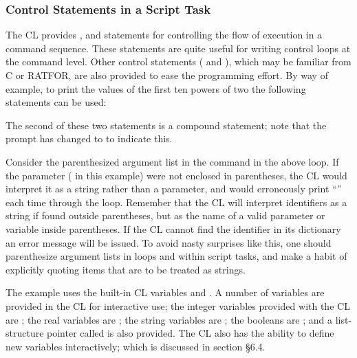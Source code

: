 \subsubsection{Control Statements in a Script Task}

The CL provides , and
 statements for controlling the flow 
of execution in a command sequence.  These statements
are quite useful for writing control loops at the command
level.  Other control statements ( and
), which may be familiar from C or RATFOR,
are also provided to ease the programming effort.
By way of example, to print the values of the first ten powers
of two the following statements can be used:

\begin{quotation}\noindent{}
\end{quotation}

\noindent
The second of these two statements is a compound statement;
note that the prompt has changed to \comptype{>>>} to indicate this.

Consider the parenthesized argument list in the 
command in the above loop.  
If the parameter ( in this example) were not enclosed in 
parentheses, the CL would interpret it as a string rather than a parameter,
and would erroneously print ``'' each time through the loop.
Remember that the CL will interpret identifiers as a string if found
outside parentheses, but as the name of a valid parameter or variable
inside parentheses.  If the CL cannot find the identifier in its
dictionary an error message will be issued.
To avoid nasty surprises like this, one should 
parenthesize argument lists in loops and within script tasks, and
make a habit of explicitly quoting items that are to be treated as
strings.

The example uses the built-in CL variables 
and .  A number of variables are provided in the CL for
interactive use; the integer variables provided with the CL
are ; the real variables are ;
the string variables are ; the booleans are 
; and a list-structure pointer called 
 is also provided.
The CL also has the ability to define new variables interactively;
which is discussed in section \S 6.4.

